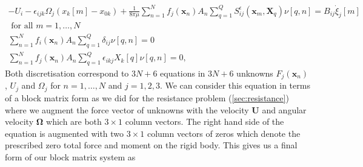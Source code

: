 \begin{equation*}
\begin{gathered}
    -U_{i}-\epsilon_{i j k} \Omega_{j}\left(x_k[{m}]-x_{0 k}\right)+\frac{1}{8 \pi\mu} \sum_{n=1}^N f_{j}(\bm{x}_n) A_n \sum_{q=1}^Q S_{i j}^{\epsilon}(\bm{x}_m, \bm{X}_q)\nu [q, n]  =  B_{i j} \dot{\xi}_{j}[m] \\ \text { for all } m = 1,\dots,N\\
    \sum_{n=1}^N f_{i}(\bm{x}_n) A_n \sum_{q=1}^Q \delta_{i j}\nu [q, n]= 0 \\
    \sum_{n=1}^N f_{j}(\bm{x}_n) A_n \sum_{q=1}^Q \epsilon_{i k j} X_{k}[q] \nu [q, n] = 0,
\end{gathered}
\end{equation*}
Both discretisation correspond to $3N + 6$ equations in $3N + 6$ unknowns $F_j(\bm{x}_n)$, $U_j$ and $\Omega_j$ for $n=1,\dots,N$ and $j=1,2,3$. We can consider this equation in terms of a block matrix form as we did for the resistance problem (\cref{sec:resistance}) where we augment the force vector of unknowns with the velocity $\boldsymbol{U}$ and angular velocity $\boldsymbol{\Omega}$ which are both $3 \times 1$ column vectors. The right hand side of the equation is augmented with two $3 \times 1$ column vectors of zeros which denote the prescribed zero total force and moment on the rigid body. This gives us a final form of our block matrix system as
